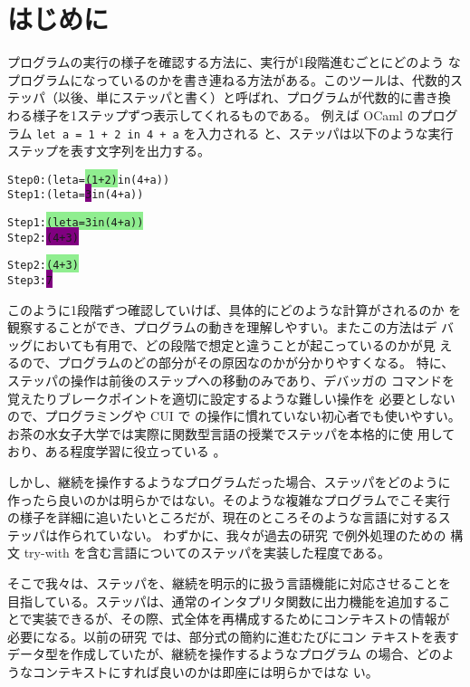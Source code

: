 \section{はじめに}

プログラムの実行の様子を確認する方法に、実行が1段階進むごとにどのよう
なプログラムになっているのかを書き連ねる方法がある。このツールは、代数的ス
テッパ（以後、単にステッパと書く）と呼ばれ、プログラムが代数的に書き換
わる様子を1ステップずつ表示してくれるものである。
例えば OCaml のプログラム \texttt{let a = 1 + 2 in 4 + a} を入力される
と、ステッパは以下のような実行ステップを表す文字列を出力する。

\begin{spacing}{0.9}
\begin{alltt}
Step 0:  (let a = \colorbox{lightgreen}{(1 + 2)} in (4 + a))
Step 1:  (let a = \colorbox{purple}{3} in (4 + a))

Step 1:  \colorbox{lightgreen}{(let a = 3 in (4 + a))}
Step 2:  \colorbox{purple}{(4 + 3)}

Step 2:  \colorbox{lightgreen}{(4 + 3)}
Step 3:  \colorbox{purple}{7}
\end{alltt}
\end{spacing}

このように1段階ずつ確認していけば、具体的にどのような計算がされるのか
を観察することができ、プログラムの動きを理解しやすい。またこの方法はデ
バッグにおいても有用で、どの段階で想定と違うことが起こっているのかが見
えるので、プログラムのどの部分がその原因なのかが分かりやすくなる。
特に、ステッパの操作は前後のステップへの移動のみであり、デバッガの
コマンドを覚えたりブレークポイントを適切に設定するような難しい操作を
必要としないので、プログラミングや CUI で の操作に慣れていない初心者でも使いやすい。
お茶の水女子大学では実際に関数型言語の授業でステッパを本格的に使
用しており、ある程度学習に役立っている \cite{FCA19}。

しかし、継続を操作するようなプログラムだった場合、ステッパをどのように
作ったら良いのかは明らかではない。そのような複雑なプログラムでこそ実行
の様子を詳細に追いたいところだが、現在のところそのような言語に対するス
テッパは作られていない。
わずかに、我々が過去の研究 \cite{FCA19} で例外処理のための
構文 try-with を含む言語についてのステッパを実装した程度である。

そこで我々は、ステッパを、継続を明示的に扱う言語機能に対応させることを
目指している。ステッパは、通常のインタプリタ関数に出力機能を追加するこ
とで実装できるが、その際、式全体を再構成するためにコンテキストの情報が
必要になる。以前の研究 \cite{FCA19} では、部分式の簡約に進むたびにコン
テキストを表すデータ型を作成していたが、継続を操作するようなプログラム
の場合、どのようなコンテキストにすれば良いのかは即座には明らかではな
い。

